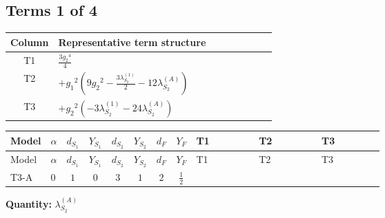 \documentclass[8pt]{article}
\begin{document}
\begin{landscape}
\subsection*{Terms 1 of 4}
\begin{center}
\begin{tabular}{@{}c >{\raggedright\arraybackslash}p{0.82\linewidth}@{}}
\toprule
Column & Representative term structure \\
\midrule
T1 & \(\displaystyle \frac{3 {g_2}^4}{4}\) \\
\midrule
T2 & \(\displaystyle +{g_1}^2 \left(9 {g_2}^2-\frac{3 {\lambda_{S_2}^{(1)}}}{2}-12 {\lambda_{S_2}^{(A)}}\right)\) \\
\midrule
T3 & \(\displaystyle +{g_2}^2 (-3 {\lambda_{S_2}^{(1)}}-24 {\lambda_{S_2}^{(A)}})\) \\
\midrule
\bottomrule
\end{tabular}
\end{center}
\smallskip
\tiny
\begin{longtable}{@{}llcccccc >{\raggedright\arraybackslash}p{0.21\linewidth} >{\raggedright\arraybackslash}p{0.21\linewidth} >{\raggedright\arraybackslash}p{0.21\linewidth}@{}}
\toprule
Model & $\alpha$ & $d_{S_1}$ & $Y_{S_1}$ & $d_{S_2}$ & $Y_{S_2}$ & $d_F$ & $Y_F$ & T1 & T2 & T3 \\
\midrule
\endfirsthead
\toprule
Model & $\alpha$ & $d_{S_1}$ & $Y_{S_1}$ & $d_{S_2}$ & $Y_{S_2}$ & $d_F$ & $Y_F$ & T1 & T2 & T3 \\
\midrule
\endhead
T3-A & $0$ & $1$ & $0$ & $3$ & $1$ & $2$ & $\frac{1}{2}$ & \scriptsize\adjustbox{max width=\linewidth}{$\begin{gathered} \frac{3 {g_2}^4}{4}\end{gathered}$} & \scriptsize\adjustbox{max width=\linewidth}{$\begin{gathered} +{g_1}^2 \left(9 {g_2}^2-\frac{3 {\lambda_{S_2}^{(1)}}}{2}-12 {\lambda_{S_2}^{(A)}}\right)\end{gathered}$} & \scriptsize\adjustbox{max width=\linewidth}{$\begin{gathered} +{g_2}^2 (-3 {\lambda_{S_2}^{(1)}}-24 {\lambda_{S_2}^{(A)}})\end{gathered}$} \\
\midrule
\bottomrule
\end{longtable}
\clearpage
\noindent\textbf{Quantity: }$\lambda_{S_2}^{(A)}$\par\smallskip

\end{landscape}
\end{document}
